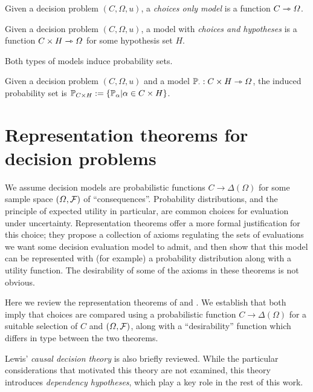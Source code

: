 \begin{definition}
Given a decision problem $(C,\Omega,u)$, a \emph{choices only model} is a function $C\rightarrowtriangle \Omega$.
\end{definition}

\begin{definition}
Given a decision problem $(C,\Omega,u)$, a model with \emph{choices and hypotheses} is a function $C\times H\rightarrowtriangle \Omega$ for some hypothesis set $H$.
\end{definition}

Both types of models induce probability sets.

\begin{definition}\label{def:induced_pset_1}
Given a decision problem $(C,\Omega,u)$ and a model $\mathbb{P}_\cdot:C\times H\rightarrowtriangle \Omega$, the induced probability set is $\mathbb{P}_{C\times H}:=\{\mathbb{P}_\alpha|\alpha\in C\times H\}$.
\end{definition}


\section{Representation theorems for decision problems }\label{sec:how_represent_conseqeunces}

We assume decision models are probabilistic functions $C\to \Delta(\Omega)$ for some sample space $(\Omega,\mathcal{F})$ of ``consequences''. Probability distributions, and the principle of expected utility in particular, are common choices for evaluation under uncertainty. Representation theorems offer a more formal justification for this choice; they propose a collection of axioms regulating the sets of evaluations we want some decision evaluation model to admit, and then show that this model can be represented with (for example) a probability distribution along with a utility function. The desirability of some of the axioms in these theorems is not obvious. 

Here we review the representation theorems of \citet{savage_foundations_1954} and \citet{jeffrey_logic_1990}. We establish that both imply that choices are compared using a probabilistic function $C\to \Delta(\Omega)$ for a suitable selection of $C$ and $(\Omega,\mathcal{F})$, along with a ``desirability'' function which differs in type between the two theorems.

Lewis' \emph{causal decision theory} is also briefly reviewed. While the particular considerations that motivated this theory are not examined, this theory introduces \emph{dependency hypotheses}, which play a key role in the rest of this work.

